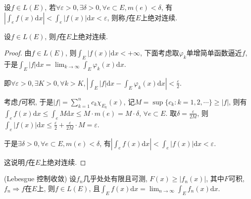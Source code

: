\documentclass[theorem=false,mathfont=none,openany,sub3section]{easybook}
\begin{document}
\begin{definition}
  设$f\in L(E)$, 若$\forall \varepsilon >0, \exists \delta >0, \forall e\subset E, m(e)<\delta$, 有$\left|\int_{e}f(x)\mathrm{d}x\right|<\int_{e}\left|f(x)\right|\mathrm{d}x<\varepsilon$, 则称$f$在$E$上绝对连续.\par
\end{definition}

\begin{theorem}
  设$f\in L(E)$, 则$f$在$E$上绝对连续.\par
\end{theorem}

\begin{proof}
  由$f\in L(E)$, 则$\int_{E}|f(x)|\mathrm{d}x<+\infty$, 下面考虑取${\varphi_k}$单增简单函数逼近$f$, 于是$\int_{E}|f|\mathrm{d}x=\lim_{k \to \infty}\int_{E}\varphi_k(x)\mathrm{d}x$.\par
  即$\forall \varepsilon >0, \exists K>0, \forall k>K, \left|\int_{E}|f|\mathrm{d}x-\int_{E}\varphi_k(x)\mathrm{d}x\right|<\frac{\varepsilon}{2}$.\par
  考虑$f$可积, 于是$|f|=\sum_{k=1}^{n}c_k\chi_{E_k}(x)$, 记$M=\sup \{c_k:k=1,2,\cdots\}\geqslant |f|$, 则有$\int_{e}f(x)\mathrm{d}x\leqslant \int_{e}M\mathrm{d}x\leqslant M\cdot m(e) = M\cdot \delta$, $\forall e\subset E$.
  取$\delta = \frac{\varepsilon}{2M}$, 则$\int_{e}|f(x)|\mathrm{d}x\leqslant \frac{\varepsilon}{2}+\frac{\varepsilon}{2M}\cdot M=\varepsilon$.\par
  于是$ \exists \delta >0, \forall e\subset E, m(e)<\delta$, 有$\left|\int_{e}f(x)\mathrm{d}x\right|<\int_{e}\left|f(x)\right|\mathrm{d}x<\varepsilon$.\par
  这说明$f$在$E$上绝对连续.\par
\end{proof}

\begin{theorem}
  (Lebesgue 控制收敛) 设$f_n$几乎处处有限且可测, $F(x)\geqslant |f_n(x)|$, 其中$F$可积, $f_n\Rightarrow f$在$E$上, 则$f\in L(E)$, 且$\int_{E}f(x)\mathrm{d}x=\lim_{n\to \infty} \int_{E}f_n(x)\mathrm{d}x$.\par
\end{theorem}
\end{document}
